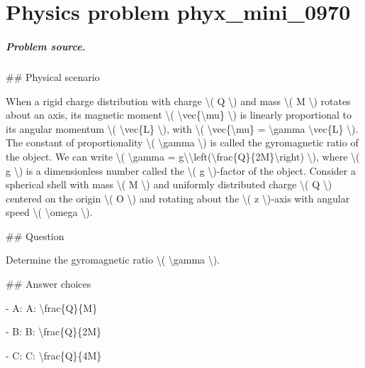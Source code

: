 
\chapter{Physics problem phyx\_mini\_0970}
\label{ch:PhyXMiniProblems_problem_phyx_mini_0970}

\paragraph{Problem source.}
\#\# Physical scenario

When a rigid charge distribution with charge \textbackslash{}( Q \textbackslash{}) and mass \textbackslash{}( M \textbackslash{}) rotates about an axis, its magnetic moment \textbackslash{}( \textbackslash{}vec\{\textbackslash{}mu\} \textbackslash{}) is linearly proportional to its angular momentum \textbackslash{}( \textbackslash{}vec\{L\} \textbackslash{}), with \textbackslash{}( \textbackslash{}vec\{\textbackslash{}mu\} = \textbackslash{}gamma \textbackslash{}vec\{L\} \textbackslash{}). The constant of proportionality \textbackslash{}( \textbackslash{}gamma \textbackslash{}) is called the gyromagnetic ratio of the object. We can write \textbackslash{}( \textbackslash{}gamma = g\textbackslash{}\textbackslash{}left(\textbackslash{}frac\{Q\}\{2M\}\textbackslash{}right) \textbackslash{}), where \textbackslash{}( g \textbackslash{}) is a dimensionless number called the \textbackslash{}( g \textbackslash{})-factor of the object. Consider a spherical shell with mass \textbackslash{}( M \textbackslash{}) and uniformly distributed charge \textbackslash{}( Q \textbackslash{}) centered on the origin \textbackslash{}( O \textbackslash{}) and rotating about the \textbackslash{}( z \textbackslash{})-axis with angular speed \textbackslash{}( \textbackslash{}omega \textbackslash{}).

\#\# Question

Determine the gyromagnetic ratio \textbackslash{}( \textbackslash{}gamma \textbackslash{}).

\#\# Answer choices

- A: A: \textbackslash{}frac\{Q\}\{M\}

- B: B: \textbackslash{}frac\{Q\}\{2M\}

- C: C: \textbackslash{}frac\{Q\}\{4M\}

